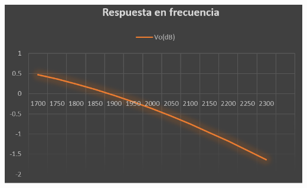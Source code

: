 \documentclass[12pt]{article}
\begin{document}
\begin{center}
    \centering
    \includegraphics[scale=0.6]{dB_response_calc.png}
\end{center}
\newpage
\end{document}
